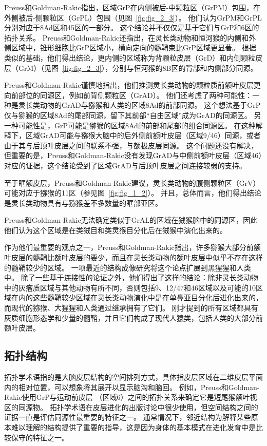 Preuss和Goldman-Rakic指出，区域GrP在内侧被后-中颗粒区（GrPM）包围，在外侧被后-侧颗粒区（GrPL）包围（见图~\ref{fig:fig_2_3}）。
他们认为GrPM和GrPL分别对应于8Ad区和45区的一部分。
这个结论并不仅仅是基于它们与GrP和6区的拓扑关系。
Preuss和Goldman-Rakic还指出，在灵长类动物和恒河猴的内侧和外侧区域中，锥形细胞比GrP区域小，横向定向的髓鞘束比GrP区域更显著。
根据类似的基础，他们得出结论，更内侧的区域称为背颗粒皮层（GrD）和内侧颗粒皮层（GrM）（见图~\ref{fig:fig_2_3}），分别与恒河猴的8B区的背部和内侧部分同源。


Preuss和Goldman-Rakic谨慎地指出，他们推测灵长类动物的颗粒质前额叶皮层更向前部位的同源区，例如前背侧颗粒区（GrAD）。
他们还考虑了两种可能性：一种是灵长类动物的GrAD与猕猴和人类的区域8Ad的前部同源。
这个想法基于GrP仅与猕猴的区域8Ad的尾部同源，留下其前部“自由区域”成为GrAD的同源区。
另一种可能性是，GrP可能是猕猴的区域8Ad的前部和尾部的组合同源区。
在这种解释下，区域GrAD可能与猕猴大脑中的后外侧前额叶皮层（区域9/46）同源，或者由于其与后顶叶皮层之间的联系不强，与额极皮层同源\cite{preuss2007evolutionary}。
这个问题还没有解决，但重要的是，Preuss和Goldman-Rakic没有发现GrAD与中侧前额叶皮层（区域46）对应的证据，这个结论受到了区域GrAD与后顶叶皮层之间连接较弱的支持。


至于眶额皮层，Preuss和Goldman-Rakic建议，灵长类动物的腹侧颗粒区（GrV）可能对应于猕猴的11区（参见图~\ref{fig:fig_1_2}）。
并且，总体而言，他们得出结论是灵长类动物具有与猕猴差不多数量的眶部亚区。


Preuss和Goldman-Rakic无法确定类似于GrAL的区域在狨猴脑中的同源区，因此他们认为这个区域是在类狨目和类灵猴目分化后在狨猴中演化出来的。


作为他们最重要的观点之一，Preuss和Goldman-Rakic指出，许多猕猴大部分前额叶皮层的髓鞘比额叶皮层的要少，而且在灵长类动物的额叶皮层中似乎不存在这样的髓鞘较少的区域。
一项最近的结构成像研究将这个论点扩展到黑猩猩和人类中\cite{glasser2011comparative}。
除了一些基于连接性的论证之外，他们得出了这样的结论：除非灵长类动物中的灰瘤质区域与其他动物有所不同，否则包括9、12/47和46区域以及可能的10区域在内的这些髓鞘较少区域在灵长类动物演化中是在单鼻亚目分化后进化出来的，而现代的猕猴、大猩猩和人类通过继承拥有了它们。
刚才提到的所有区域都具有灰质细胞形态学和少量的髓鞘，并且它们构成了现代人猿类，包括人类的大部分前额叶皮层。


\subsection{拓扑结构}

拓扑学术语指的是大脑皮层结构的空间排列方式，具体指皮层区域在二维皮层平面内的相对位置，可以想象将其展开以显示脑沟和脑回。
例如，Preuss和Goldman-Rakic使用GrP与运动前皮层 （区域6）之间的拓扑关系来确定它是短尾猴额叶视区的同源物。
拓扑学术语在皮层进化的出版讨论中很少使用，但空间结构之间的证据一直是评估同源性最重要的特征之一。
通常情况下，邻近结构为解释某些原本难以理解的结构提供了重要的指导，这是因为身体的基本模式在进化发育中是比较保守的特征之一。


